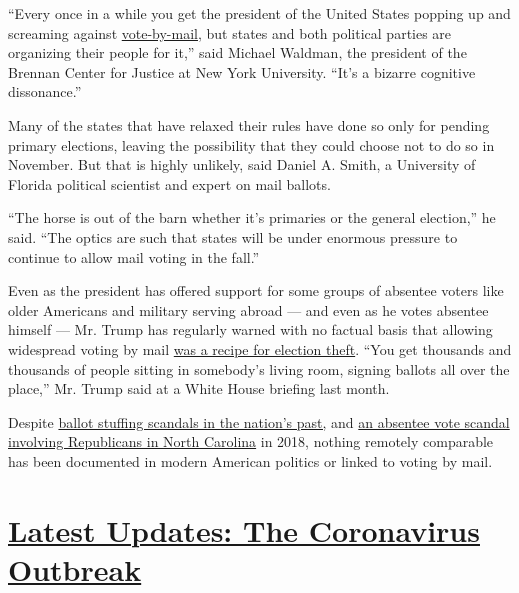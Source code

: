 ``Every once in a while you get the president of the United States
popping up and screaming against
\href{https://www.nytimes3xbfgragh.onion/2020/06/19/us/politics/nyc-vote-by-mail.html}{vote-by-mail},
but states and both political parties are organizing their people for
it,'' said Michael Waldman, the president of the Brennan Center for
Justice at New York University. ``It's a bizarre cognitive dissonance.''

Many of the states that have relaxed their rules have done so only for
pending primary elections, leaving the possibility that they could
choose not to do so in November. But that is highly unlikely, said
Daniel A. Smith, a University of Florida political scientist and expert
on mail ballots.

``The horse is out of the barn whether it's primaries or the general
election,'' he said. ``The optics are such that states will be under
enormous pressure to continue to allow mail voting in the fall.''

Even as the president has offered support for some groups of absentee
voters like older Americans and military serving abroad --- and even as
he votes absentee himself --- Mr. Trump has regularly warned with no
factual basis that allowing widespread voting by mail
\href{https://www.nytimes3xbfgragh.onion/2020/05/20/us/politics/trump-michigan-vote-by-mail.html?action=click\&module=Spotlight\&pgtype=Homepage}{was
a recipe for election theft}. ``You get thousands and thousands of
people sitting in somebody's living room, signing ballots all over the
place,'' Mr. Trump said at a White House briefing last month.

Despite
\href{https://vdocuments.mx/the-terre-haute-election-trial.html}{ballot
stuffing scandals in the nation's past,} and
\href{https://www.nytimes3xbfgragh.onion/2019/02/18/us/north-carolina-election-fraud.html?action=click\&module=RelatedCoverage\&pgtype=Article\&region=Footer}{an
absentee vote scandal involving Republicans in North Carolina} in 2018,
nothing remotely comparable has been documented in modern American
politics or linked to voting by mail.

\hypertarget{latest-updates-the-coronavirus-outbreak}{%
\section{\texorpdfstring{\href{https://www.nytimes3xbfgragh.onion/2020/09/11/world/covid-19-coronavirus.html?action=click\&pgtype=Article\&state=default\&region=MAIN_CONTENT_1\&context=storylines_live_updates}{Latest
Updates: The Coronavirus
Outbreak}}{Latest Updates: The Coronavirus Outbreak}}\label{latest-updates-the-coronavirus-outbreak}}

